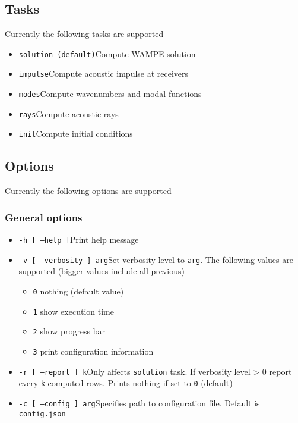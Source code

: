 \documentclass[12pt]{extarticle}
\newcommand{\code}[1]{\colorbox{gray!10}{\texttt{#1}}}
\begin{document}
        \subsection{Tasks}
            \par Currently the following tasks are supported
            \begin{itemize}
                \item\code{solution (default)}\qquad Compute WAMPE solution
                \item\code{impulse}\qquad Compute acoustic impulse at receivers
                \item\code{modes}\qquad Compute wavenumbers and modal functions
                \item\code{rays}\qquad Compute acoustic rays
                \item\code{init}\qquad Compute initial conditions
            \end{itemize}
        \subsection{Options}
            \par Currently the following options are supported
            \subsubsection{General options}
                \begin{itemize}
                    \item\code{-h [ --help ]}\qquad Print help message
                    \item\code{-v [ --verbosity ] arg}\qquad Set verbosity level to \texttt{arg}. The following values are supported (bigger values include all previous)
                        \begin{itemize}
                            \item\code{0} nothing (default value)
                            \item\code{1} show execution time
                            \item\code{2} show progress bar
                            \item\code{3} print configuration information
                        \end{itemize}
                   \item\code{-r [ --report ] k}\qquad Only affects \code{solution} task. If verbosity level > 0 report every \code{k} computed rows. Prints nothing if set to \code{0} (default)
                   \item\code{-c [ --config ] arg}\qquad Specifies path to configuration file. Default is \code{config.json}
                \end{itemize}
\end{document}

